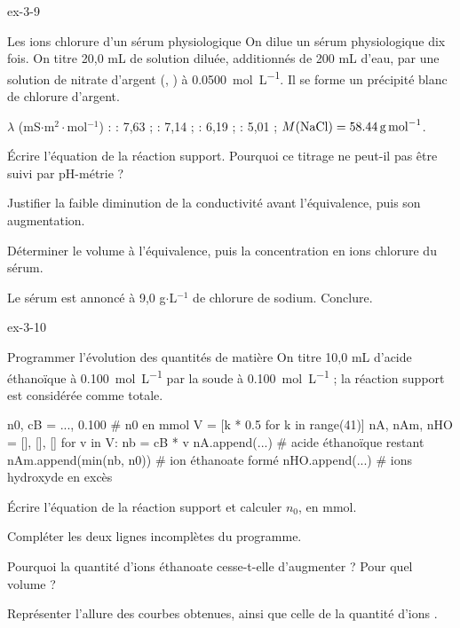 \begin{blocLivre}{ex-3-9}
\begin{exercice}[2]{Les ions chlorure d'un sérum physiologique}
On dilue un sérum physiologique dix fois. On titre 20,0 mL de solution diluée, additionnés de 200 mL d'eau, par une
solution de nitrate d'argent (, ) à \qty{0,0500}{mol.L^{-1}}. Il se forme un précipité blanc de
chlorure d'argent.
\begin{donnees}
$\lambda$ (mS$\cdot$m$^2\cdot$mol$^{-1}$) :  : 7,63 ;  : 7,14 ;  : 6,19 ;  : 5,01 ;
$M(\ce{NaCl})=\qty{58,44}{g.mol^{-1}}$.
\end{donnees}
\begin{questions}
\item Écrire l'équation de la réaction support. Pourquoi ce titrage ne peut-il pas être suivi par pH-métrie ?
\item Justifier la faible diminution de la conductivité avant l'équivalence, puis son augmentation.
\item Déterminer le volume à l'équivalence, puis la concentration en ions chlorure du sérum.
\item Le sérum est annoncé à 9,0 g$\cdot$L$^{-1}$ de chlorure de sodium. Conclure.
\end{questions}
\end{exercice}
\end{blocLivre}
\begin{blocLivre}{ex-3-10}
\begin{exercice}[2]{Programmer l'évolution des quantités de matière}
On titre 10,0 mL d'acide éthanoïque à \qty{0,100}{mol.L^{-1}} par la soude à \qty{0,100}{mol.L^{-1}} ; la réaction
support est considérée comme totale.
\begin{python}
n0, cB = ..., 0.100        # n0 en mmol
V = [k * 0.5 for k in range(41)]
nA, nAm, nHO = [], [], []
for v in V:
    nb = cB * v
    nA.append(...)           # acide éthanoïque restant
    nAm.append(min(nb, n0))  # ion éthanoate formé
    nHO.append(...)          # ions hydroxyde en excès
\end{python}
\begin{questions}
\item {}Écrire l'équation de la réaction support et calculer $n_0$, en mmol.
\item Compléter les deux lignes incomplètes du programme.
\item Pourquoi la quantité d'ions éthanoate cesse-t-elle d'augmenter ? Pour quel volume ?
\item Représenter l'allure des courbes obtenues, ainsi que celle de la quantité d'ions .
\end{questions}
\end{exercice}
\end{blocLivre}
